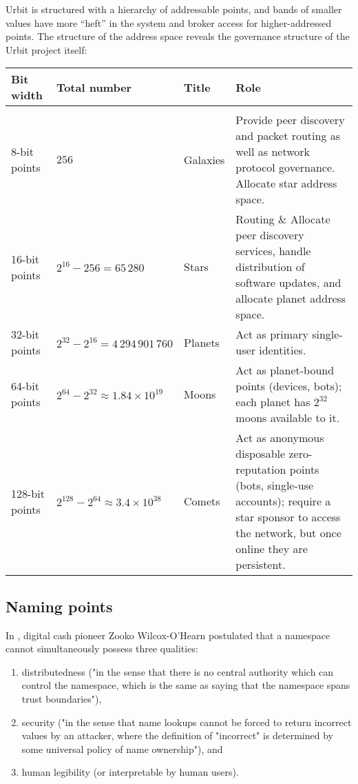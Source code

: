 {{{Urbit is structured with a hierarchy of addressable points, and bands of smaller values have more ``heft'' in the system and broker access for higher-addressed points.  The structure of the address space reveals the governance structure of the Urbit project itself:

\begin{tabular}{llll}
	Bit width & Total number & Title & Role \\ \hline \\
  8-bit points & $256$ & Galaxies & Provide peer discovery and packet routing as well as network protocol governance.  Allocate star address space. \\
	16-bit points & $2^{16}-256 = 65\,280$ & Stars & Routing \& Allocate peer discovery services, handle distribution of software updates, and allocate planet address space. \\
	32-bit points & $2^{32}-2^{16} = 4\,294\,901\,760$ & Planets & Act as primary single-user identities. \\
	64-bit points & $2^{64}-2^{32} \approx 1.84 \times 10^{19}$ & Moons & Act as planet-bound points (devices, bots); each planet has $2^{32}$ moons available to it. \\
	128-bit points & $2^{128}-2^{64} \approx 3.4 \times 10^{38}$ & Comets & Act as anonymous disposable zero-reputation points (bots, single-use accounts); require a star sponsor to access the network, but once online they are persistent. \\
\end{tabular}

\subsection{Naming points}

In \citeyear{Zooko2001}, digital cash pioneer Zooko Wilcox-O'Hearn postulated that a namespace cannot simultaneously possess three qualities:

\begin{enumerate}
	\item  distributedness ("in the sense that there is no central authority which can control the namespace, which is the same as saying that the namespace spans trust boundaries"),
	\item  security ("in the sense that name lookups cannot be forced to return incorrect values by an attacker, where the definition of "incorrect" is determined by some universal policy of name ownership"), and
	\item  human legibility (or interpretable by human users).
\end{enumerate}

}}}
